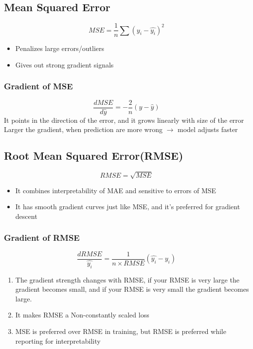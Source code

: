 \documentclass[12pt]{extarticle}
\begin{document}
\subsection{Mean Squared Error}
$$MSE = \frac{1}{n}\sum{(y_i - \hat{y_i})^2}$$ 
\begin{itemize}
    \item Penalizes large errors/outliers 
    \item Gives out strong gradient signals  
\end{itemize}
\subsubsection{Gradient of MSE}
$$\frac{d MSE}{d\hat{y}} = -\frac{2}{n}(y-\hat{y})$$
It points in the direction of the error, and it grows linearly with size of the error
Larger the gradient, when prediction are more wrong \(\longrightarrow\) model adjusts faster


\subsection{Root Mean Squared Error(RMSE)}  
$$RMSE = \sqrt{MSE}$$ 
\begin{itemize}
    \item It combines interpretability of MAE and sensitive to errors of MSE
    \item It has smooth gradient curves just like MSE, and it's preferred for gradient descent 
\end{itemize}

\subsubsection{Gradient of RMSE}
$$ \frac{d RMSE}{\hat{y_i}} = \frac{1}{n \times RMSE} (\hat{y_i}-y_i)$$
\begin{enumerate}
    \item The gradient strength changes with RMSE, if your RMSE is very large the gradient becomes small, and if your RMSE is very small the gradient becomes large.
    \item It makes RMSE a Non-constantly scaled loss
    \item MSE is preferred over RMSE in training, but RMSE is preferred while reporting for interpretability  
\end{enumerate}
\end{document}
